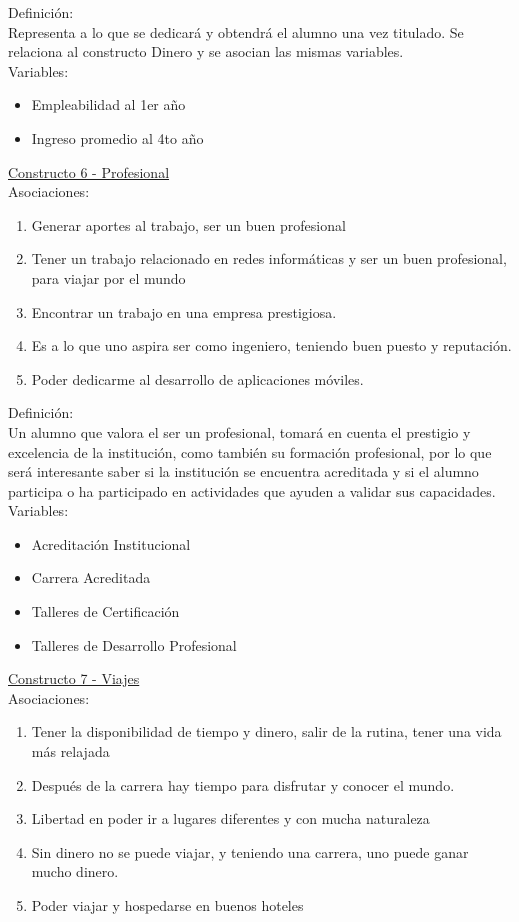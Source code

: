 Definición:\\
Representa a lo que se dedicará y obtendrá el alumno una vez titulado. Se relaciona al constructo Dinero y se asocian las mismas variables.\\

Variables:
\begin{itemize}
	\item Empleabilidad al 1er año
	\item Ingreso promedio al 4to año	
\end{itemize} 


\underline {Constructo 6 - Profesional} \\
Asociaciones:
\begin{enumerate}
	\item Generar aportes al trabajo, ser un buen profesional
	\item Tener un trabajo relacionado en redes informáticas y ser un buen profesional, para viajar por el mundo
	\item Encontrar un trabajo en una empresa prestigiosa.	
	\item Es a lo que uno aspira ser como ingeniero, teniendo buen puesto y reputación.
	\item Poder dedicarme al desarrollo de aplicaciones móviles.
\end{enumerate}

Definición:\\
Un alumno que valora el ser un profesional, tomará en cuenta el prestigio y excelencia de la institución, como también su formación profesional, por lo que será interesante saber si la institución se encuentra acreditada y si el alumno participa o ha participado en actividades que ayuden a validar sus capacidades.\\

Variables:
\begin{itemize}
	\item Acreditación Institucional
	\item Carrera Acreditada
	\item Talleres de Certificación
	\item Talleres de Desarrollo Profesional	
\end{itemize} 


\underline {Constructo 7 - Viajes} \\
Asociaciones:
\begin{enumerate}
	\item Tener la disponibilidad de tiempo y dinero, salir de la rutina, tener una vida más relajada
	\item Después de la carrera hay tiempo para disfrutar y conocer el mundo. 
	\item Libertad en poder ir a lugares diferentes y con mucha naturaleza
	\item Sin dinero no se puede viajar, y teniendo una carrera, uno puede ganar mucho dinero.	
	\item Poder viajar y hospedarse en buenos hoteles
\end{enumerate}

